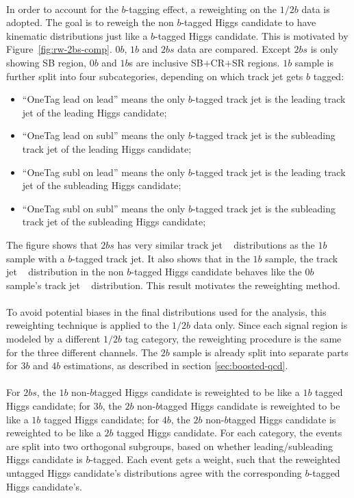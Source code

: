 \paragraph{}
In order to account for the $b$-tagging effect, a reweighting on the $1/2b$ data is adopted. 
The goal is to reweigh the non $b$-tagged Higgs candidate to have kinematic distributions just like a $b$-tagged Higgs candidate. 
This is motivated by Figure~\ref{fig:rw-2bs-comp}.
$0b$, $1b$ and $2bs$ data are compared.
Except $2bs$ is only showing SB region, $0b$ and $1b$s are inclusive SB$+$CR$+$SR regions.
$1b$ sample is further split into four subcategories, depending on which track jet gets $b$ tagged:
\begin{itemize}
\item ``OneTag lead on lead'' means the only $b$-tagged track jet is the leading track jet of the leading Higgs candidate;
\item ``OneTag lead on subl'' means the only $b$-tagged track jet is the subleading track jet of the leading Higgs candidate;
\item ``OneTag subl on lead'' means the only $b$-tagged track jet is the leading track jet of the subleading Higgs candidate; 
\item ``OneTag subl on subl'' means the only $b$-tagged track jet is the subleading track jet of the subleading Higgs candidate;
\end{itemize}
The figure shows that $2bs$ has very similar track jet \pt~ distributions as the $1b$ sample with a $b$-tagged track jet.
It also shows that in the $1b$ sample, the track jet \pt~ distribution in the non $b$-tagged Higgs candidate behaves like the $0b$ sample's track jet \pt~ distribution.
This result motivates the reweighting method.

\paragraph{}
To avoid potential biases in the final distributions used for the analysis, this reweighting technique is applied to the $1/2b$ data only. 
Since each signal region is modeled by a different $1/2b$ tag category, the reweighting procedure is the same for the three different channels. 
The $2b$ sample is already split into separate parts for $3b$ and $4b$ estimations, as described in section \ref{sec:boosted-qcd}.

\paragraph{}
For $2bs$, the $1b$ non-$b$tagged Higgs candidate is reweighted to be like a $1b$ tagged Higgs candidate; for $3b$, the $2b$ non-$b$tagged Higgs candidate is reweighted to be like a $1b$ tagged Higgs candidate; for $4b$, the $2b$ non-$b$tagged Higgs candidate is reweighted to be like a $2b$ tagged Higgs candidate.
For each category, the events are split into two orthogonal subgroups, based on whether leading/subleading Higgs candidate is $b$-tagged.
Each event gets a weight, such that the reweighted untagged Higgs candidate's distributions agree with the corresponding $b$-tagged Higgs candidate's.


